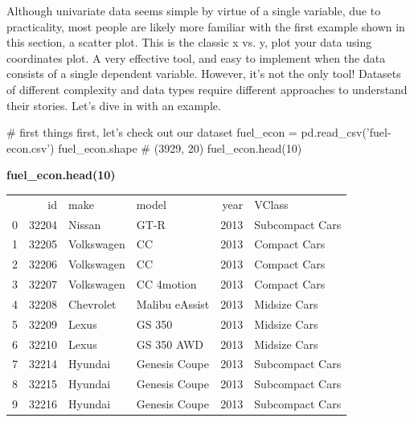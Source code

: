 Although univariate data seems simple by virtue of a single variable, due to practicality, most people are likely more familiar with the first example shown in this section, a scatter plot. This is the classic x vs. y, plot your data using coordinates plot. A very effective tool, and easy to implement when the data consists of a single dependent variable. However, it's not the only tool! Datasets of different complexity and data types require different approaches to understand their stories. Let's dive in with an example.

\begin{python}
	# first things first, let's check out our dataset
	fuel_econ = pd.read_csv('fuel-econ.csv')
	fuel_econ.shape
	# (3929, 20)
	fuel_econ.head(10)
\end{python}

\begin{center}
\textbf{fuel\_econ.head(10)}
\end{center}
	\begin{tabular}{lrllrl}
		{} &     id &        make &           model &  year &           VClass \\
		0 &  32204 &      Nissan &            GT-R &  2013 &  Subcompact Cars \\
		1 &  32205 &  Volkswagen &              CC &  2013 &     Compact Cars \\
		2 &  32206 &  Volkswagen &              CC &  2013 &     Compact Cars \\
		3 &  32207 &  Volkswagen &      CC 4motion &  2013 &     Compact Cars \\
		4 &  32208 &   Chevrolet &  Malibu eAssist &  2013 &     Midsize Cars \\
		5 &  32209 &       Lexus &          GS 350 &  2013 &     Midsize Cars \\
		6 &  32210 &       Lexus &      GS 350 AWD &  2013 &     Midsize Cars \\
		7 &  32214 &     Hyundai &   Genesis Coupe &  2013 &  Subcompact Cars \\
		8 &  32215 &     Hyundai &   Genesis Coupe &  2013 &  Subcompact Cars \\
		9 &  32216 &     Hyundai &   Genesis Coupe &  2013 &  Subcompact Cars \\
	\end{tabular}
	
